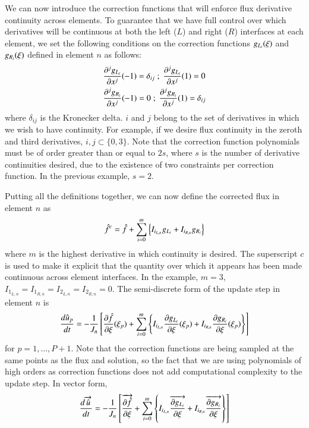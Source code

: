 We can now introduce the correction functions that will enforce flux derivative continuity across elements. To guarantee that we have full control over which derivatives will be continuous at both the left ($L$) and right ($R$) interfaces at each element, we set the following conditions on the correction functions ${g_{L_i}}(\xi)$ and ${g_{R_i}}(\xi)$ defined in
element $n$ as follows:
\begin{equation}
\label{eq:gconstraints}
\begin{split}
&{\frac{\partial ^j {g_{L_i}}}{\partial x^j}}(-1) = \delta_{ij} \; ; \; {\frac{\partial ^j {g_{L_i}}}{\partial x^j}}(1) =
0 \\
&{\frac{\partial ^j {g_{R_i}}}{\partial x^j}}(-1) = 0 \; ; \; {\frac{\partial ^j {g_{R_i}}}{\partial x^j}}(1) = \delta_{ij}
\end{split}
\end{equation}
where $\delta_{ij}$ is the Kronecker delta. $i$ and $j$ belong to the set of derivatives in which we wish to have continuity. For example, if we desire flux continuity in the zeroth and third derivatives, $i,j \subset \{0,3\}$. Note that the correction function polynomials must be of order greater than or equal to $2s$, where $s$ is the number of derivative continuities desired, due to the existence of two constraints per correction function. In the previous example, $s=2$.

Putting all the definitions together, we can now define the corrected flux in element $n$ as
\begin{equation}
\label{eq:f_corrected}
 {\hat{f}}^{c} = {\hat{f}} + \sum^m_{i=0}\left\{ {I_{i_{L,n}}} {g_{L_i}} + {I_{i_{R,n}}} {g_{R_i}}
 \right\}
\end{equation}
where $m$ is the highest derivative in which continuity is desired. The superscript $c$ is used to make it explicit that the quantity over which it appears has been made continuous across element interfaces. In the example, $m=3$, $I_{1_{L,n}} = I_{1_{R,n}} = I_{2_{L,n}} = I_{2_{R,n}} = 0$.
The semi-discrete form of the update step in element $n$ is
\begin{equation}
\frac{d \hat{u}_p}{d t} = -\frac{1}{J_n} \left[ {\frac{\partial {\hat{f}}}{\partial \xi}}(\xi_p) + \sum_{i=0}^m \left\{ {I_{i_{L,n}}}
{\frac{\partial {g_{L_i}}}{\partial \xi}}(\xi_p) + {I_{i_{R,n}}} {\frac{\partial {g_{R_i}}}{\partial \xi}}(\xi_p)\right\} \right]
\end{equation}
for $p = 1,\ldots,P+1$. Note that the correction functions are being sampled at the same points as the flux and solution, so the fact that we are using polynomials of high orders as correction functions does not add computational complexity to the update step.
In vector form,
\begin{equation}
\frac{d \overrightarrow{\hat{u}}}{d t} = -\frac{1}{J_n} \left[ \overrightarrow{{\frac{\partial {\hat{f}}}{\partial \xi}}} + \sum_{i=0}^m
\left\{ {I_{i_{L,n}}}
\overrightarrow{{\frac{\partial {{g_{L_i}}}}{\partial \xi}}} + {I_{i_{R,n}}} \overrightarrow{{\frac{\partial {{g_{R_i}}}}{\partial \xi}}}\right\}
\right]
\end{equation}


